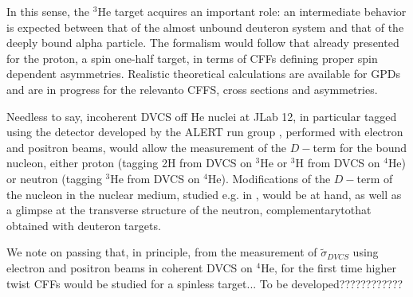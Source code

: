 \documentclass[times, twoside]{PosWhiPap}
\begin{document}
\vskip 0.5cm

In this sense, the $^3$He target acquires an important role: 
an intermediate behavior is expected between that of the almost unbound
deuteron system and that of the deeply bound alpha particle.
The formalism would follow that already presented for the proton, 
a spin one-half target, in terms of CFFs defining proper spin dependent asymmetries.
Realistic theoretical calculations
are available for GPDs\cite{Scopetta:2004kj,Scopetta:2009sn,Rinaldi:2012ft,Rinaldi:2012pj} and are in progress for the relevanto CFFS, cross sections and asymmetries. 

\vskip 0.5cm

Needless to say, incoherent DVCS off He nuclei at JLab 12, in particular tagged using the detector
developed by the ALERT run group \cite{Armstrong:2017zcm},
performed with electron and positron beams,
would allow the measurement of the $D-$term for the bound nucleon, either proton (tagging 2H from DVCS on $^3$He
or $^3$H from DVCS on $^4$He) or neutron (tagging $^3$He from DVCS on $^4$He).
Modifications of the $D-$term of the nucleon in the nuclear medium, studied e.g. in \cite{Jung:2014jja},
would be at hand, as well as a glimpse at the transverse structure of the neutron, complementarytothat obtained with deuteron targets.

\vskip 0.5cm

We note on passing that, in principle, from the measurement of $\tilde \sigma_{DVCS}$ using electron and positron beams in coherent DVCS on $^4$He,
for the first time higher twist CFFs would be studied for a spinless target...
To be developed????????????







\end{document}
